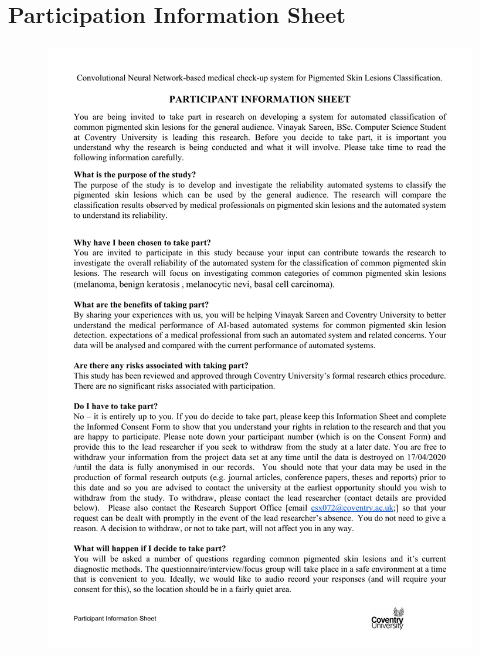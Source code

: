 \subsection*{Participation Information Sheet}
\begin{figure}[!htp]
    \centering
    \includegraphics[width=12cm]{Documents/participation.pdf}
\end{figure}
